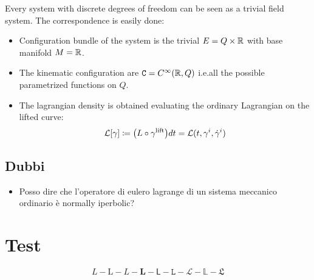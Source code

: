 \documentclass[Main]{subfiles}
\begin{document}
		  	Every system with discrete degrees of freedom can be seen as a trivial field system.
			The correspondence is easily done:
			\begin{itemize}
				\item Configuration bundle of the system is the trivial $E= Q \times \mathbb{R}$ with base manifold $M=\mathbb{R}$.
				\item The kinematic configuration are $\mathtt{C}=C^\infty(\mathbb{R},Q)$ i.e.all the possible parametrized functions on $Q$.
				\item The lagrangian density is obtained evaluating the ordinary Lagrangian on the lifted curve:
					\begin{equation}
						\mathcal{L}  [\gamma] \coloneqq \big( L \circ	\gamma^\textrm{lift} \big) dt  = \mathcal{L}(t,\gamma^i,\dot{\gamma}^i)
					\end{equation}
	\end{itemize}


	\danger \danger \danger \danger 	\danger \danger \danger \danger 	\danger \danger \danger \danger 
	\section{Dubbi}
	\begin{itemize}
		\item Posso dire che l'operatore di eulero lagrange di un sistema meccanico ordinario è normally iperbolic?
	\end{itemize}



\chapter{Test}
	$$L - \mathrm{L} - \mathit{L}  - \mathbf{L} - \mathsf{L} - \mathtt{L}- \mathcal{L}- \mathbb{L}- \mathfrak{L}$$
\end{document}
